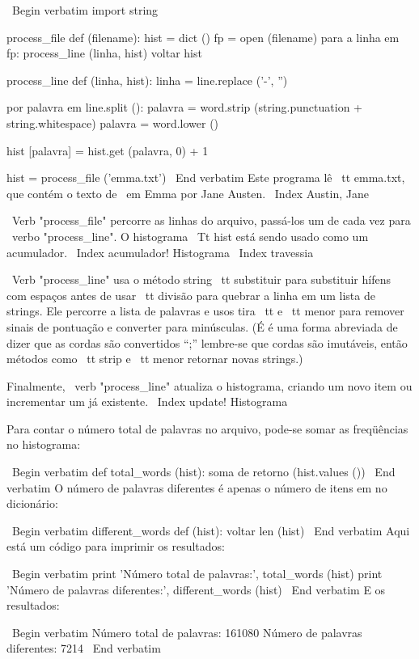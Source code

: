\documentclass[10pt]{book}
\begin{document}
{{{{{{{{{\ Begin {verbatim}
import string

process_file def (filename):
    hist = dict ()
    fp = open (filename)
    para a linha em fp:
        process_line (linha, hist)
    voltar hist

process_line def (linha, hist):
    linha = line.replace ('-', '')
    
    por palavra em line.split ():
        palavra = word.strip (string.punctuation + string.whitespace)
        palavra = word.lower ()

        hist [palavra] = hist.get (palavra, 0) + 1

hist = process_file ('emma.txt')
\ End {verbatim}
%
Este programa lê {\ tt emma.txt}, que contém o texto de {\ em
  Emma} por Jane Austen.
\ Index {Austin, Jane}

\ Verb "process_file" percorre as linhas do arquivo,
passá-los um de cada vez para \ verbo "process_line". O histograma
{\ Tt hist} está sendo usado como um acumulador.
\ Index {acumulador! Histograma}
\ Index {travessia}

\ Verb "process_line" usa o método string {\ tt substituir} para substituir
hífens com espaços antes de usar {\ tt divisão} para quebrar a linha em um
lista de strings. Ele percorre a lista de palavras e usos {tira \ tt}
e {\ tt menor} para remover sinais de pontuação e converter para minúsculas. (É
é uma forma abreviada de dizer que as cordas são convertidos ``;'' lembre-se que
cordas são imutáveis, então métodos como {\ tt strip} e {\ tt menor}
retornar novas strings.)

Finalmente, \ verb "process_line" atualiza o histograma, criando um novo
item ou incrementar um já existente.
\ Index {update! Histograma}

Para contar o número total de palavras no arquivo, pode-se somar
as freqüências no histograma:

\ Begin {verbatim}
def total_words (hist):
    soma de retorno (hist.values ​​())
\ End {verbatim}
%
O número de palavras diferentes é apenas o número de itens em
no dicionário:

\ Begin {verbatim}
different_words def (hist):
    voltar len (hist)
\ End {verbatim}
%
Aqui está um código para imprimir os resultados:

\ Begin {verbatim}
print 'Número total de palavras:', total_words (hist)
print 'Número de palavras diferentes:', different_words (hist)
\ End {verbatim}
%
E os resultados:

\ Begin {verbatim}
Número total de palavras: 161080
Número de palavras diferentes: 7214
\ End {verbatim}
%

}}}}}}}}}
\end{document}
